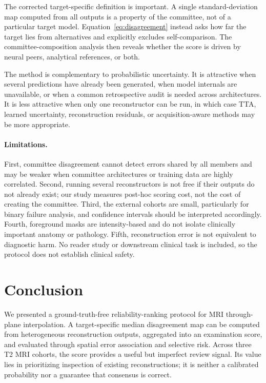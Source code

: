 \documentclass[twocolumn]{article}
\begin{document}
The corrected target-specific definition is important. A single standard-deviation map computed from all outputs is a property of the committee, not of a particular target model. Equation~\eqref{eq:disagreement} instead asks how far the target lies from alternatives and explicitly excludes self-comparison. The committee-composition analysis then reveals whether the score is driven by neural peers, analytical references, or both.

The method is complementary to probabilistic uncertainty. It is attractive when several predictions have already been generated, when model internals are unavailable, or when a common retrospective audit is needed across architectures. It is less attractive when only one reconstructor can be run, in which case TTA, learned uncertainty, reconstruction residuals, or acquisition-aware methods may be more appropriate.

\paragraph{Limitations.}
First, committee disagreement cannot detect errors shared by all members and may be weaker when committee architectures or training data are highly correlated. Second, running several reconstructors is not free if their outputs do not already exist; our study measures post-hoc scoring cost, not the cost of creating the committee. Third, the external cohorts are small, particularly for binary failure analysis, and confidence intervals should be interpreted accordingly. Fourth, foreground masks are intensity-based and do not isolate clinically important anatomy or pathology. Fifth, reconstruction error is not equivalent to diagnostic harm. No reader study or downstream clinical task is included, so the protocol does not establish clinical safety.

\section{Conclusion}

We presented a ground-truth-free reliability-ranking protocol for MRI through-plane interpolation. A target-specific median disagreement map can be computed from heterogeneous reconstruction outputs, aggregated into an examination score, and evaluated through spatial error association and selective risk. Across three T2 MRI cohorts, the score provides a useful but imperfect review signal. Its value lies in prioritizing inspection of existing reconstructions; it is neither a calibrated probability nor a guarantee that consensus is correct.



\end{document}
